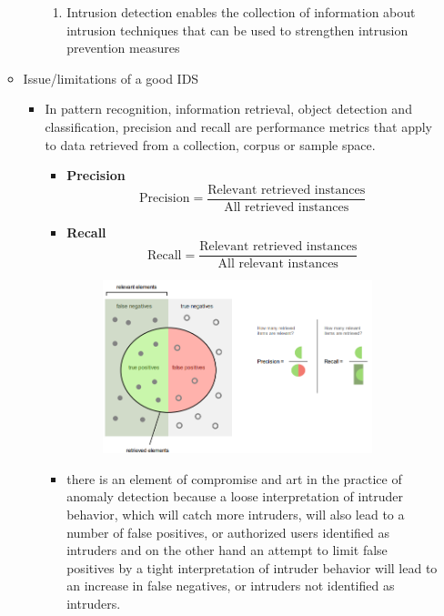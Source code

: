 \documentclass{article}
\begin{document}
\begin{itemize}
\begin{itemize}
\begin{itemize}
\begin{enumerate}
                \item Intrusion detection enables the collection of information about intrusion techniques that can be used to strengthen intrusion prevention measures
            \end{enumerate}
        \end{itemize}
        \item Issue/limitations of a good IDS
        \begin{itemize}
            \item In pattern recognition, information retrieval, object detection and classification, precision and recall are performance metrics that apply to data retrieved from a collection, corpus or sample space.
            \begin{itemize}
                \item \textbf{Precision}
                \begin{equation}
                    \text{Precision} = \frac{\text{Relevant retrieved instances}}{\text{All retrieved instances}}
                \end{equation}
                \item \textbf{Recall}
                \begin{equation}
                    \text{Recall} = \frac{\text{Relevant retrieved instances}}{\text{All relevant instances}}
                \end{equation}
                \begin{figure}[h]
                    \centering
                    \includegraphics[width=0.90\textwidth]{figure/precision_recall.png}
                \end{figure}
                \item there is an element of compromise and art in the practice of anomaly detection because a loose interpretation of intruder behavior, which will catch more intruders, will also lead to a number of false positives, or authorized users identified as intruders and on the other hand an attempt to limit false positives by a tight interpretation of intruder behavior will lead to an increase in false negatives, or intruders not identified as intruders.

\end{itemize}
\end{itemize}
\end{itemize}
\end{itemize}
\end{document}

